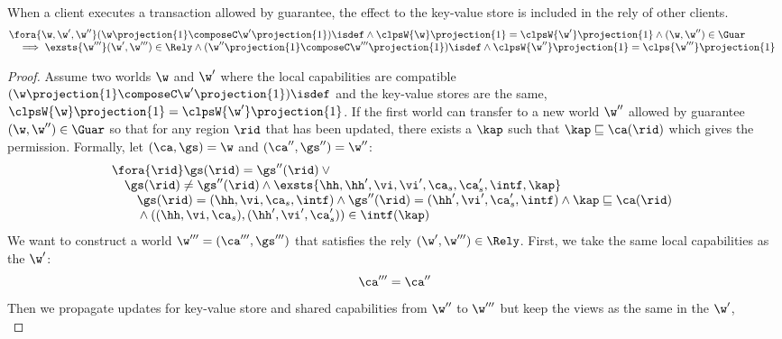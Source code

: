 \begin{lemma}
\label{lem:locality-update}
When a client executes a transaction allowed by guarantee, the effect to the key-value store is included in the rely of other clients.
\[
\begin{array}{@{}l}
    \fora{\w, \w', \w''} (\w\projection{1} \composeC \w'\projection{1})\isdef \land \clpsW{\w}\projection{1} = \clpsW{\w'}\projection{1} \land (\w, \w'') \in \Guar  \\
    \quad \implies \exsts{\w'''} (\w', \w''') \in \Rely \land (\w''\projection{1} \composeC \w'''\projection{1})\isdef \land \clpsW{\w''}\projection{1} = \clps{\w'''}\projection{1}
\end{array} 
\]
\end{lemma}
\begin{proof}
Assume two worlds \( \w \) and \( \w' \) where the local capabilities are compatible \((\w\projection{1} \composeC \w'\projection{1})\isdef\) and the key-value stores are the same, \ie \( \clpsW{\w}\projection{1} = \clpsW{\w'}\projection{1} \).
If the first world can transfer to a new world \( \w'' \) allowed by guarantee \( (\w, \w'' ) \in \Guar \) so that for any region \( \rid \) that has been updated, there exists a \( \kap \) such that \( \kap \sqsubseteq \ca(\rid) \) which gives the permission.
Formally, let \( (\ca, \gs) = \w \) and \( (\ca'', \gs'') = \w'' \):
\[
\begin{array}{@{}l}
    \fora{\rid} 
    \gs(\rid) = \gs''(\rid) \lor {} \\
    \quad \gs(\rid) \neq \gs''(\rid) 
    \land \exsts{\hh, \hh', \vi, \vi', \ca_s, \ca_{s}', \intf, \kap} \\
    \qquad \gs(\rid) = (\hh, \vi, \ca_{s}, \intf) 
    \land \gs''(\rid) = (\hh', \vi', \ca_{s}', \intf)
    \land \kap \sqsubseteq \ca(\rid) \\
    \qquad {} \land ((\hh, \vi, \ca_{s}), (\hh', \vi', \ca_{s}')) \in \intf(\kap)
\end{array} 
\]
We want to construct a world \( \w''' = (\ca''', \gs''') \) that satisfies the rely \( (\w', \w''') \in \Rely \).
First, we take the same local capabilities as the \( \w' \):
\begin{equation}
\label{equ:construct-local-ca}
    \ca''' = \ca''
\end{equation}
Then we propagate updates for key-value store and shared capabilities from \( \w'' \) to \( \w''' \) but keep the views as the same in the \( \w' \),
\begin{equation}

\end{equation}
\end{proof}
